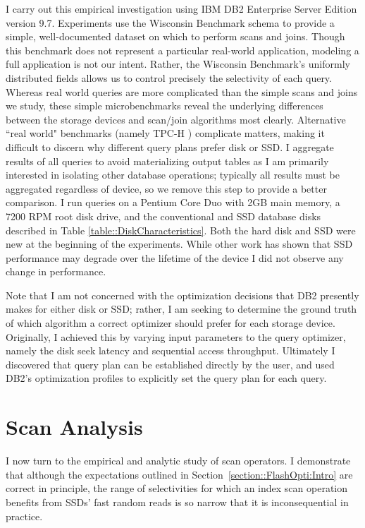 I carry out this empirical investigation using IBM DB2 Enterprise Server Edition version 9.7.
Experiments use the Wisconsin Benchmark schema \cite{Bitton83benchmarkingdatabase} to provide a simple, well-documented dataset on which to perform scans and joins.
Though this benchmark does not represent a particular real-world application, modeling a full application is not our intent.
Rather, the Wisconsin Benchmark's uniformly distributed fields allows us to control precisely the selectivity of each query.
Whereas real world queries are more complicated than the simple scans and joins we study, these simple microbenchmarks reveal the underlying differences between the storage devices and scan/join algorithms most clearly.
Alternative ``real world" benchmarks (namely TPC-H ) complicate matters, making it difficult to discern why different query plans prefer disk or SSD.
I aggregate results of all queries to avoid materializing output tables as I am primarily interested in isolating other database operations; typically all results must be aggregated regardless of device, so we remove this step to provide a better comparison.
I run queries on a Pentium Core Duo with 2GB main memory, a 7200 RPM root disk drive, and the conventional and SSD database disks described in Table \ref{table::DiskCharacteristics}.
Both the hard disk and SSD were new at the beginning of the experiments.
While other work has shown that SSD performance may degrade over the lifetime of the device I did not observe any change in performance.

Note that I am not concerned with the optimization decisions that DB2 presently makes for either disk or SSD; rather, I am seeking to determine the ground truth of which algorithm a correct optimizer should prefer for each storage device. 
Originally, I achieved this by varying input parameters to the query optimizer, namely the disk seek latency and sequential access throughput.
Ultimately I discovered that query plan can be established directly by the user, and used DB2's optimization profiles to explicitly set the query plan for each query.

\section{Scan Analysis}
\label{sec:FlashOpti:Scans}

I now turn to the empirical and analytic study of scan operators.
I demonstrate that although the expectations outlined in Section~\ref{section::FlashOpti:Intro} are correct in principle, the range of selectivities for which an index scan operation benefits from SSDs' fast random reads is so narrow that it is inconsequential in practice.

